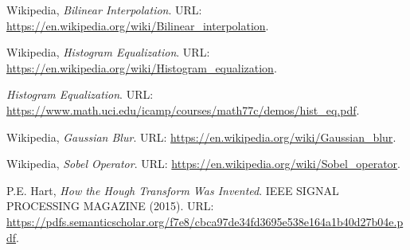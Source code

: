 \begin{thebibliography}{3}
Wikipedia,
\emph{Bilinear Interpolation}.
URL: \url{https://en.wikipedia.org/wiki/Bilinear_interpolation}.

Wikipedia,
\emph{Histogram Equalization}.
URL: \url{https://en.wikipedia.org/wiki/Histogram_equalization}.


\emph{Histogram Equalization}.
URL: \url{https://www.math.uci.edu/icamp/courses/math77c/demos/hist_eq.pdf}.


Wikipedia,
\emph{Gaussian Blur}.
URL: \url{https://en.wikipedia.org/wiki/Gaussian_blur}.


Wikipedia,
\emph{Sobel Operator}.
URL: \url{https://en.wikipedia.org/wiki/Sobel_operator}.


P.E. Hart,
\emph{How the Hough Transform Was Invented}.
IEEE SIGNAL PROCESSING MAGAZINE
(2015).
URL: \url{https://pdfs.semanticscholar.org/f7e8/cbca97de34fd3695e538e164a1b40d27b04e.pdf}.







%
%
%


\end{thebibliography}
\nonfrenchspacing
